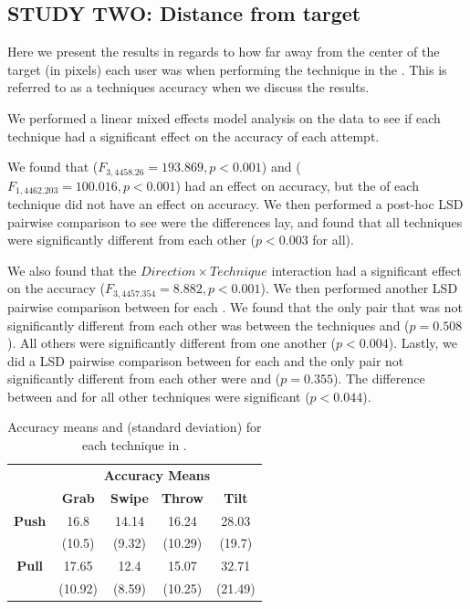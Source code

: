 \subsection{STUDY TWO: Distance from target}
Here we present the results in regards to how far away from the center of the target (in pixels) each user was when performing the technique in the \accuracy. 
This is referred to as a techniques accuracy when we discuss the results. 

We performed a linear mixed effects model analysis on the data to see if each technique had a significant effect on the accuracy of each attempt. 

We found that \technique ($F_{3,4458.26}=193.869, p<0.001$) and \targetsize ($F_{1,4462.203}=100.016, p<0.001$) had an effect on accuracy, but the \direction of each technique did not have an effect on accuracy. 
We then performed a post-hoc LSD pairwise comparison to see were the differences lay, and found that all techniques were significantly different from each other ($p<0.003$ for all).

We also found that the $Direction \times Technique$ interaction had a significant effect on the accuracy ($F_{3,4457.354}=8.882, p<0.001$).
We then performed another LSD pairwise comparison between \technique for each \direction. 
We found that the only pair that was not significantly different from each other was between the techniques \grab \push and \throw \push ($p=0.508$). 
All others were significantly different from one another ($p<0.004$). 
Lastly, we did a LSD pairwise comparison between \direction for each \technique and the only pair not significantly different from each other were \grab \push and \grab \pull ($p=0.355$).
The difference between \pull and \push for all other techniques were significant ($p<0.044$).

\begin{table}[H]
	\centering
	\def\arraystretch{1}
		\begin{tabular}{c c c c c}
			& \multicolumn{4}{c}{\textbf{Accuracy Means}} \B \\
			\cline{2-5}
			& \textbf{Grab} & \textbf{Swipe} & \textbf{Throw} & \textbf{Tilt} \T\B \\ \hline
			\textbf{Push} & 16.8 & 14.14 & 16.24 & 28.03 \T \\ 
			& (10.5) & (9.32) & (10.29) & (19.7) \B \\ \hline
			\textbf{Pull} & 17.65 & 12.4 & 15.07 & 32.71 \T \\
			& (10.92) & (8.59) & (10.25) & (21.49) \B \\ \hline
		\end{tabular}
	\caption{Accuracy means and (standard deviation) for each technique in \accuracy.}
	\label{tab:accuracy}
\end{table}

